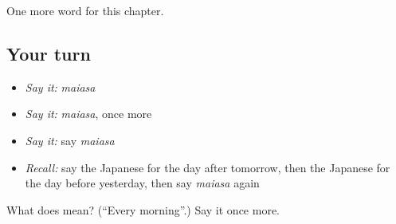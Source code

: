\begin{grammarlens}[title={What you've built}]
One more word for this chapter.
\end{grammarlens}

\subsection*{Your turn}
\begin{itemize}
\raggedright
  \item \emph{Say it:} \emph{maiasa}
  \item \emph{Say it:} \emph{maiasa}, once more
  \item \emph{Say it:} say \emph{maiasa}
  \item \emph{Recall:} say the Japanese for the day after tomorrow, then the Japanese for the day before yesterday, then say \emph{maiasa} again
\end{itemize}

\begin{tcolorbox}[breakable,colback=teal!4,colframe=teal!35!black,title={Before you move on}]
What does  mean? (\textquotedblleft{}Every morning\textquotedblright{}.) Say it once more.
\end{tcolorbox}
